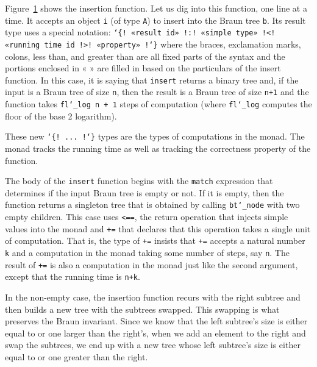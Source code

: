 \documentclass{llncs}
\newcommand{\Scribtexttt}[1]{{\texttt{#1}}}
\newcommand{\Stttextmore}{{\fontencoding{T1}\selectfont>}}
\newcommand{\Stttextless}{{\fontencoding{T1}\selectfont<}}
\newcommand{\FigureRef}[2]{\hyperref[#2]{#1}}
\begin{document}
Figure~\FigureRef{1}{t:x28counter_x28x22figurex22_x22figx3ainsertx22x29x29} shows the insertion function.
Let us dig into this function, one line at a time.
It accepts an object \Scribtexttt{i} (of type \Scribtexttt{A}) to insert into
the Braun tree \Scribtexttt{b}. Its result type uses a special notation:
\Scribtexttt{{\char`\{}{\hbox{\texttt{!}}} «result id» {\hbox{\texttt{!}}}{\hbox{\texttt{:}}}{\hbox{\texttt{!}}} «simple type» {\hbox{\texttt{!}}}{\Stttextless}{\hbox{\texttt{!}}} «running time id {\hbox{\texttt{!}}}{\Stttextmore}{\hbox{\texttt{!}}} «property» {\hbox{\texttt{!}}}{\char`\}}}
where the braces, exclamation marks, colons, less than, and
greater than are all fixed parts of the syntax and the
portions enclosed in « » are filled in based on the
particulars of the insert function. In this case, it is
saying that
\Scribtexttt{insert} returns a binary tree and, if the input is a
Braun tree of size \Scribtexttt{n}, then the result is a Braun tree
of size
\Scribtexttt{n+1} and the function takes \Scribtexttt{fl{\char`\_}log n + 1} steps
of computation (where \Scribtexttt{fl{\char`\_}log} computes the floor of the
base 2 logarithm).

These new \Scribtexttt{{\char`\{}{\hbox{\texttt{!}}} {\hbox{\texttt{.}}}{\hbox{\texttt{.}}}{\hbox{\texttt{.}}} {\hbox{\texttt{!}}}{\char`\}}} types are the types of
computations in the monad. The monad tracks the running
time as well as tracking the correctness property of the
function.

The body of the \Scribtexttt{insert} function begins with the
\Scribtexttt{match} expression that determines if the input Braun
tree is empty or not. If it is empty, then the function
returns a singleton tree that is obtained by calling
\Scribtexttt{bt{\char`\_}node} with two empty children. This case uses
\Scribtexttt{{\Stttextless}==}, the return operation that injects simple values
into the monad and \Scribtexttt{+=} that declares that this
operation takes a single unit of computation. That is, the
type of \Scribtexttt{+=} insists that \Scribtexttt{+=} accepts a natural number
\Scribtexttt{k} and a computation in the monad taking some number of
steps, say \Scribtexttt{n}. The result of \Scribtexttt{+=} is also a
computation in the monad just like the second argument,
except that the running time is \Scribtexttt{n+k}.

In the non{-}empty case, the insertion function recurs with
the right subtree and then builds a new tree with the subtrees
swapped. This swapping is what preserves the Braun invariant.
Since we know that the left subtree{'}s size is either equal to or one
larger than the right{'}s, when we add an element to the right and swap
the subtrees, we end up with a new tree whose left
subtree{'}s size is either equal to or one greater than the right.
\end{document}
